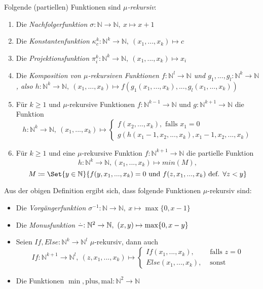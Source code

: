 \documentclass{cheat-sheet}
\newcommand{\monus}{\stackrel{{}^{\scriptstyle .}}{\smash{-}}}
\begin{document}
\begin{definition}
  Folgende (partiellen) Funktionen sind \emph{$\mu$-rekursiv}:
  \begin{enumerate}
    \item Die \it{Nachfolgerfunktion} $\sigma : \mathbb{N} \to \mathbb{N},\ x \mapsto x + 1$
    \item Die \it{Konstantenfunktion} $\kappa_{c}^{k} : \mathbb{N}^{k} \to \mathbb{N},\ (x_{1}, ..., x_{k}) \mapsto c$
    \item Die \it{Projektionsfunktion} $\pi_{i}^{k} : \mathbb{N}^{k} \to \mathbb{N},\ (x_{1}, ..., x_{k}) \mapsto x_{i}$
    \item Die \it{Komposition} von $\mu$-rekursiven Funktionen $f : \mathbb{N}^{l} \to \mathbb{N}$ und $g_{1}, ..., g_{l} : \mathbb{N}^{k} \to \mathbb{N}$, also $h : \mathbb{N}^{k} \to \mathbb{N},\ (x_{1}, ..., x_{k}) \mapsto f(g_{1}(x_{1}, ..., x_{k}), ..., g_{l}(x_{1}, ..., x_{k}))$
    \item Für $k \ge 1$ und $\mu$-rekursive Funktionen $f : \mathbb{N}^{k-1} \to \mathbb{N}$ und $g : \mathbb{N}^{k + 1} \to \mathbb{N}$ die Funktion
      { \scriptsize
      \[ h : \mathbb{N}^{k} \to \mathbb{N},\ (x_{1}, ..., x_{k}) \mapsto \begin{cases} f(x_{2}, ..., x_{k}), \text{ falls } x_{1} = 0 \\ g(h(x_{1} - 1, x_{2}, ..., x_{k}), x_{1} - 1, x_{2}, ..., x_{k}) \end{cases} \]
      }
    \item Für $k \ge 1$ und eine $\mu$-rekursive Funktion $f : \mathbb{N}^{k + 1} \to \mathbb{N}$ die partielle Funktion
      { \scriptsize
      \[ h : \mathbb{N}^{k} \to \mathbb{N}, (x_{1}, ..., x_{k}) \mapsto min(M), \]
      \[ M \coloneqq \Set{ y \in \mathbb{N} }{ f(y, x_1, ..., x_k) = 0 \text{ und } f(z, x_1, ..., x_k) \text{ def. } \forall z < y } \]
      }
  \end{enumerate}
\end{definition}

\begin{bem}
Aus der obigen Definition ergibt sich, dass folgende Funktionen $\mu$-rekursiv sind:
\begin{itemize}
  \item Die \it{Vorgängerfunktion} $\sigma^{-1} : \mathbb{N} \to \mathbb{N},\ x \mapsto \max\{0, x - 1\}$
  \item Die \it{Monusfunktion} $\monus : \mathbb{N}^{2} \to \mathbb{N},\ (x, y) \mapsto \max\{0, x - y\}$
  \item Seien $If, Else : \mathbb{N}^k \to \mathbb{N}^{l}$ $\mu$-rekursiv, dann auch
    \[ If : \mathbb{N}^{k + 1} \to \mathbb{N}^{l},\ (z, x_1, ..., x_k) \mapsto \begin{cases}If(x_1, ..., x_k), & \text{ falls } z = 0\\Else(x_1, ..., x_k), & \text{ sonst }\end{cases} \]
  \item Die Funktionen $\min, \mathrm{plus}, \mathrm{mal} : \mathbb{N}^2 \to \mathbb{N}$

\end{itemize}
\end{bem}
\end{document}
